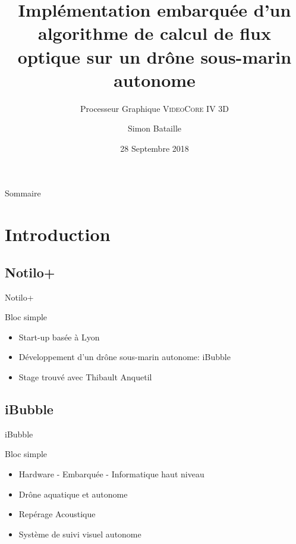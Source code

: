 \documentclass{bredelebeamer}
\title[Calcul du flux optique sur Raspbery Pi]{Implémentation embarquée d'un algorithme de calcul de flux optique sur un dr\^one sous-marin autonome}
\subtitle{Processeur Graphique \textsc{VideoCore IV 3D}}
\author{Simon Bataille\inst{1}}
\institute[Université de Caen Normandie]
{
  \inst{1}%
  ESIX NORMANDIE\\
  Département Mécatronique \& Systèmes Nomades
  }
\date{28 Septembre 2018}
\begin{document}
\begin{frame}
  \titlepage
\end{frame}





\begin{frame}{Sommaire}
  \tableofcontents
\end{frame}




\section{Introduction}
	\subsection{Notilo+}

\begin{frame}{Notilo+}
\begin{block}{Bloc simple}
\begin{itemize}
\item Start-up basée à Lyon
\item Développement d'un dr\^one sous-marin autonome: iBubble
\item Stage trouvé avec Thibault Anquetil
\end{itemize}
\end{block}

\end{frame}

	\subsection{iBubble}
\begin{frame}{iBubble}
\begin{block}{Bloc simple}
\begin{itemize}
\item Hardware - Embarquée - Informatique haut niveau
\item Dr\^one aquatique et autonome
\item Repérage Acoustique
\item Système de suivi visuel autonome
\end{itemize}
\end{block}
\end{frame}
\end{document}
